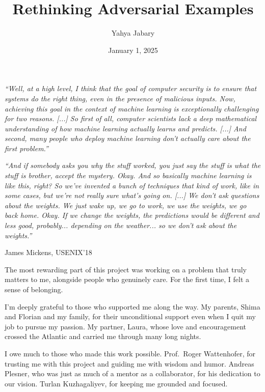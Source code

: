 \documentclass[a4paper, oneside]{discothesis}
\title{Rethinking Adversarial Examples}
\author{Yahya Jabary}
\institute{Computer Engineering and Networks Laboratory \\[2pt] ETH Zürich}
\date{January 1, 2025}
\newcommand{\linebreaks}{\vspace*{0.5em}}
\begin{document}
\frontmatter
\maketitle

\cleardoublepage

\begin{acknowledgements}
	\begin{quotebox}
		\begin{flushright}
			\textit{``Well, at a high level, I think that the goal of computer security is to ensure that systems do the right thing, even in the presence of malicious inputs. Now, achieving this goal in the context of machine learning is exceptionally challenging for two reasons. [...] So first of all, computer scientists lack a deep mathematical understanding of how machine learning actually learns and predicts. [...] And second, many people who deploy machine learning don't actually care about the first problem.''}
			\vspace{1em}
	
			\textit{``And if somebody asks you why the stuff worked, you just say the stuff is what the stuff is brother, accept the mystery. Okay. And so basically machine learning is like this, right? So we've invented a bunch of techniques that kind of work, like in some cases, but we're not really sure what's going on. [...] We don't ask questions about the weights. We just wake up, we go to work, we use the weights, we go back home. Okay. If we change the weights, the predictions would be different and less good, probably... depending on the weather... so we don't ask about the weights.''}
			\vspace{1em}
	
			James Mickens, USENIX'18~\cite{218395}
		\end{flushright}
	\end{quotebox}

	\linebreaks

	The most rewarding part of this project was working on a problem that truly matters to me, alongside people who genuinely care. For the first time, I felt a sense of belonging.

	I'm deeply grateful to those who supported me along the way. My parents, Shima and Florian and my family, for their unconditional support \textendash{} even when I quit my job to pursue my passion. My partner, Laura, whose love and encouragement crossed the Atlantic and carried me through many long nights.

	I owe much to those who made this work possible. Prof.\ Roger Wattenhofer, for trusting me with this project and guiding me with wisdom and humor. Andreas Plesner, who was just as much of a mentor as a collaborator, for his dedication to our vision. Turlan Kuzhagaliyev, for keeping me grounded and focused.


\end{acknowledgements}
\end{document}
